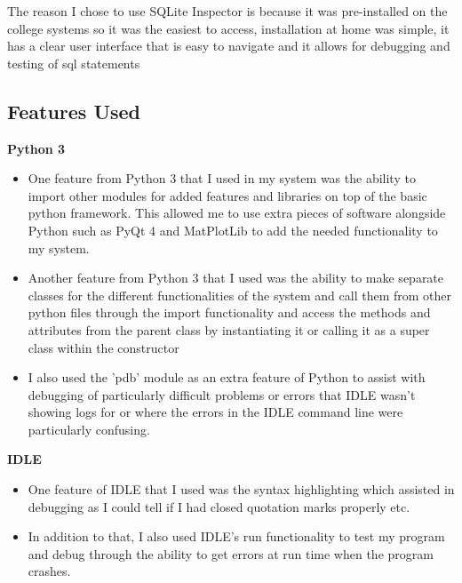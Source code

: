 The reason I chose to use SQLite Inspector is because it was pre-installed on the college systems so it was the easiest to access, installation at home was simple, it has a clear user interface that is easy to navigate and it allows for debugging and testing of sql statements

\subsection{Features Used}
\textbf{Python 3}
\begin{itemize}
	\item One feature from Python 3 that I used in my system was the ability to import other modules for added features and libraries on top of the basic python framework. This allowed me to use extra pieces of software alongside Python such as PyQt 4 and MatPlotLib to add the needed functionality to my system. 

	\item Another feature from Python 3 that I used was the ability to make separate classes for the different functionalities of the system and call them from other python files through the import functionality and access the methods and attributes from the parent class by instantiating it or calling it as a super class within the constructor

	\item I also used the 'pdb' module as an extra feature of Python to assist with debugging of particularly difficult problems or errors that IDLE wasn't showing logs for or where  the errors in the IDLE command line were particularly confusing.
\end{itemize}

\textbf{IDLE}
\begin{itemize}
	\item One feature of IDLE that I used was the syntax highlighting which assisted in debugging as I could tell if I had closed quotation marks properly etc.
	\item In addition to that, I also used IDLE's run functionality to test my program and debug through the ability to get errors at run time when the program crashes.
\end{itemize}

